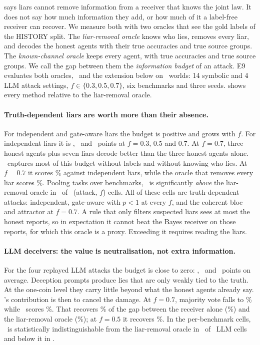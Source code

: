  says liars cannot remove information from a receiver that knows the joint law. It does not say how much information they add, or how much of it a label-free receiver can recover. We measure both with two oracles that see the gold labels of the HISTORY split. The \emph{liar-removal oracle} knows who lies, removes every liar, and decodes the honest agents with their true accuracies and true source groups. The \emph{known-channel oracle} keeps every agent, with true accuracies and true source groups. We call the gap between them the \emph{information budget} of an attack. E9 evaluates both oracles, \race\ and the extension below on \nWorldsExt\ worlds: 14 symbolic and 4 LLM attack settings, $f\in\{0.3,0.5,0.7\}$, six benchmarks and three seeds.  shows every method relative to the liar-removal oracle.

\paragraph{Truth-dependent liars are worth more than their absence.} For independent and gate-aware liars the budget is positive and grows with $f$. For independent liars it is \budgetIndepThree, \budgetIndepFive\ and \budgetIndepSeven\ points at $f=0.3$, $0.5$ and $0.7$. At $f=0.7$, three honest agents plus seven liars decode better than the three honest agents alone. \race\ captures most of this budget without labels and without knowing who lies. At $f=0.7$ it scores \extRaceIndepSeven\% against independent liars, while the oracle that removes every liar scores \extRemovalIndepSeven\%. Pooling tasks over benchmarks, \race\ is significantly \emph{above} the liar-removal oracle in \pooledRemovalWins\ of \pooledRemovalCells\ (attack, $f$) cells. All of these cells are truth-dependent attacks: independent, gate-aware with $p<1$ at every $f$, and the coherent bloc and attractor at $f=0.7$. A rule that only filters suspected liars sees at most the honest reports, so in expectation it cannot beat the Bayes receiver on those reports, for which this oracle is a proxy. Exceeding it requires reading the liars.

\paragraph{LLM deceivers: the value is neutralisation, not extra information.} For the four replayed LLM attacks the budget is close to zero: \budgetLlmThree, \budgetLlmFive\ and \budgetLlmSeven\ points on average. Deception prompts produce lies that are only weakly tied to the truth. At the one-coin level they carry little beyond what the honest agents already say. \race's contribution is then to cancel the damage. At $f=0.7$, majority vote falls to \extLlmMajSeven\% while \race\ scores \extLlmRaceSeven\%. That recovers \recoveryLlmSeven\% of the gap between the receiver alone (\extLlmSelfSeven\%) and the liar-removal oracle (\removalSeven\%); at $f=0.5$ it recovers \recoveryLlmFive\%. In the per-benchmark cells, \race\ is statistically indistinguishable from the liar-removal oracle in \removalLlmTies\ of \removalLlmCells\ LLM cells and below it in \removalLlmLosses.


